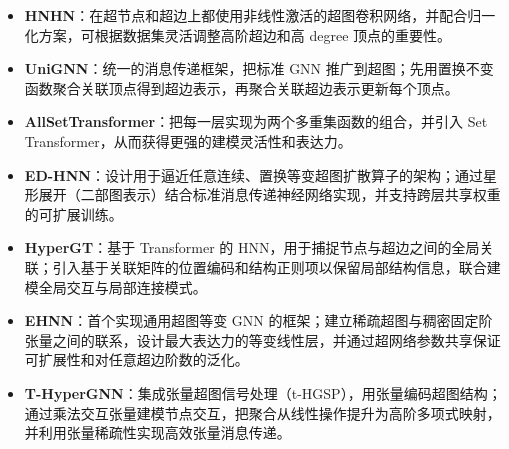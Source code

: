 \begin{itemize}
    \item \textbf{HNHN}\cite{dong2020hnhn}：在超节点和超边上都使用非线性激活的超图卷积网络，并配合归一化方案，可根据数据集灵活调整高阶超边和高 degree 顶点的重要性。
    \item \textbf{UniGNN}\cite{huang2021unignn}：统一的消息传递框架，把标准 GNN 推广到超图；先用置换不变函数聚合关联顶点得到超边表示，再聚合关联超边表示更新每个顶点。
    \item \textbf{AllSetTransformer}\cite{chien2022you,lee2019set}：把每一层实现为两个多重集函数的组合，并引入 Set Transformer，从而获得更强的建模灵活性和表达力。
    \item \textbf{ED-HNN}\cite{wang2023equivariant}：设计用于逼近任意连续、置换等变超图扩散算子的架构；通过星形展开（二部图表示）结合标准消息传递神经网络实现，并支持跨层共享权重的可扩展训练。
    \item \textbf{HyperGT}\cite{liu2024hypergraph}：基于 Transformer 的 HNN，用于捕捉节点与超边之间的全局关联；引入基于关联矩阵的位置编码和结构正则项以保留局部结构信息，联合建模全局交互与局部连接模式。
    
    \vspace{0.5em} %
    
    \item \textbf{EHNN}\cite{kim2022equivariant}：首个实现通用超图等变 GNN 的框架；建立稀疏超图与稠密固定阶张量之间的联系，设计最大表达力的等变线性层，并通过超网络参数共享保证可扩展性和对任意超边阶数的泛化。
    \item \textbf{T-HyperGNN}\cite{wang2024thypergnns,pena2023thgsp}：集成张量超图信号处理（t-HGSP），用张量编码超图结构；通过乘法交互张量建模节点交互，把聚合从线性操作提升为高阶多项式映射，并利用张量稀疏性实现高效张量消息传递。
\end{itemize}
